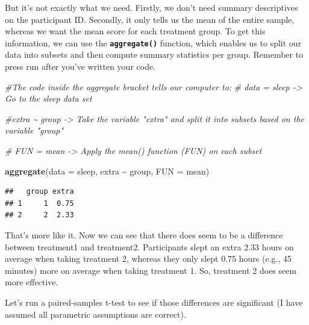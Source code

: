 \documentclass[
]{book}
\newenvironment{Shaded}{\begin{snugshade}}{\end{snugshade}}
\newcommand{\AttributeTok}[1]{\textcolor[rgb]{0.13,0.29,0.53}{#1}}
\newcommand{\CommentTok}[1]{\textcolor[rgb]{0.56,0.35,0.01}{\textit{#1}}}
\newcommand{\ConstantTok}[1]{\textcolor[rgb]{0.56,0.35,0.01}{#1}}
\newcommand{\DecValTok}[1]{\textcolor[rgb]{0.00,0.00,0.81}{#1}}
\newcommand{\FunctionTok}[1]{\textcolor[rgb]{0.13,0.29,0.53}{\textbf{#1}}}
\newcommand{\NormalTok}[1]{#1}
\newcommand{\SpecialCharTok}[1]{\textcolor[rgb]{0.81,0.36,0.00}{\textbf{#1}}}
\begin{document}
But it's not exactly what we need. Firstly, we don't need summary descriptives on the participant ID. Secondly, it only tells us the mean of the entire sample, whereas we want the mean score for each treatment group. To get this information, we can use the \textbf{\texttt{aggregate()}} function, which enables us to split our data into subsets and then compute summary statistics per group. Remember to press run after you've written your code.

\begin{Shaded}
\begin{Highlighting}[]
\CommentTok{\#The code inside the aggregate bracket tells our computer to: }
\CommentTok{\# data = sleep {-}\textgreater{} Go to the sleep data set}

\CommentTok{\#extra \textasciitilde{} group {-}\textgreater{} Take the variable "extra" and split it into subsets based on the variable "group"}

\CommentTok{\# FUN = mean {-}\textgreater{} Apply the mean() function (FUN) on each subset }

\FunctionTok{aggregate}\NormalTok{(}\AttributeTok{data =}\NormalTok{ sleep, extra }\SpecialCharTok{\textasciitilde{}}\NormalTok{ group, }\AttributeTok{FUN =}\NormalTok{ mean)}
\end{Highlighting}
\end{Shaded}

\begin{verbatim}
##   group extra
## 1     1  0.75
## 2     2  2.33
\end{verbatim}

That's more like it. Now we can see that there does seem to be a difference between treatment1 and treatment2. Participants slept an extra 2.33 hours on average when taking treatment 2, whereas they only slept 0.75 hours (e.g., 45 minutes) more on average when taking treatment 1. So, treatment 2 does seem more effective.

Let's run a paired-samples t-test to see if those differences are significant (I have assumed all parametric assumptions are correct).

\begin{Shaded}
\end{Shaded}
\end{document}
